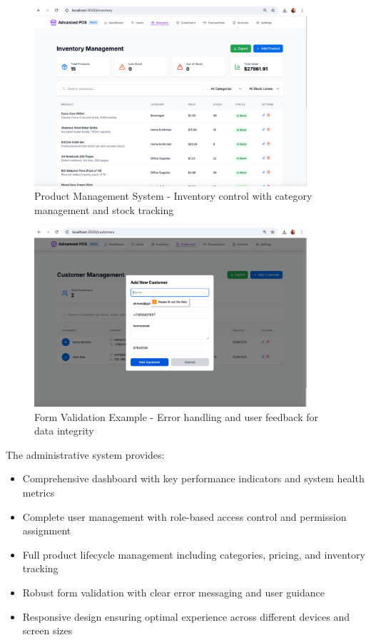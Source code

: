 \begin{figure}[H]
  \centering
  \includegraphics[width=0.9\textwidth]{working app screenshots/productmanagement.png}
  \caption{Product Management System - Inventory control with category management and stock tracking}
  \label{fig:productmanagement}
\end{figure}

\begin{figure}[H]
  \centering
  \includegraphics[width=0.9\textwidth]{working app screenshots/customererror.png}
  \caption{Form Validation Example - Error handling and user feedback for data integrity}
  \label{fig:customererror}
\end{figure}

The administrative system provides:

\begin{itemize}
  \item Comprehensive dashboard with key performance indicators and system health metrics
  \item Complete user management with role-based access control and permission assignment
  \item Full product lifecycle management including categories, pricing, and inventory tracking
  \item Robust form validation with clear error messaging and user guidance
  \item Responsive design ensuring optimal experience across different devices and screen sizes
\end{itemize}

